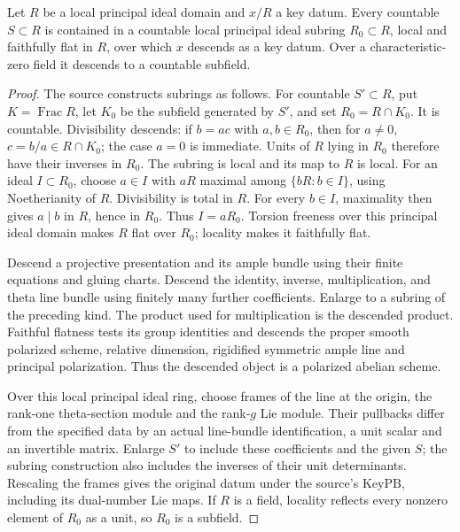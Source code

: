 \begin{srlemma}
\label{lem:ftb-key-countable-descent}
Let \(R\) be a local principal ideal domain and \(x/R\) a key datum.
Every countable \(S\subset R\) is contained in a countable local
principal ideal subring \(R_0\subset R\), local and faithfully flat
in \(R\), over which \(x\) descends as a key datum.
Over a characteristic-zero field it descends to a countable subfield.
\end{srlemma}
\begin{proof}
The source constructs subrings as follows.
For countable \(S'\subset R\), put \(K=\operatorname{Frac}R\), let
\(K_0\) be the subfield generated by \(S'\), and set \(R_0=R\cap K_0\).
It is countable.  Divisibility descends: if \(b=ac\) with
\(a,b\in R_0\), then for \(a\ne0\), \(c=b/a\in R\cap K_0\);
the case \(a=0\) is immediate.  Units of \(R\) lying in \(R_0\)
therefore have their inverses in \(R_0\).
The subring is local and its map to \(R\) is local.
For an ideal \(I\subset R_0\), choose \(a\in I\) with \(aR\)
maximal among \(\{bR:b\in I\}\), using Noetherianity of \(R\).
Divisibility is total in \(R\).  For every \(b\in I\), maximality
then gives \(a\mid b\) in \(R\), hence in \(R_0\).
Thus \(I=aR_0\).  Torsion freeness over this principal ideal domain
makes \(R\) flat over \(R_0\); locality makes it faithfully flat.

Descend a projective presentation and its ample bundle using their
finite equations and gluing charts.  Descend the identity, inverse,
multiplication, and theta line bundle using finitely many further
coefficients.  Enlarge to a subring of the preceding kind.
The product used for multiplication is the descended product.
Faithful flatness tests its group identities and descends the
proper smooth polarized scheme, relative dimension, rigidified
symmetric ample line and principal polarization.
Thus the descended object is a polarized abelian scheme.

Over this local principal ideal ring, choose frames of the line at
the origin, the rank-one theta-section module and the rank-\(g\)
Lie module.  Their pullbacks differ from the specified data by an
actual line-bundle identification, a unit scalar and an invertible
matrix.  Enlarge \(S'\) to include these coefficients and the given
\(S\); the subring construction also includes the inverses of their
unit determinants.  Rescaling the frames gives the original datum
under the source's \(\mathrm{KeyPB}\), including its dual-number
Lie maps.  If \(R\) is a field, locality reflects every nonzero
element of \(R_0\) as a unit, so \(R_0\) is a subfield.
\end{proof}

